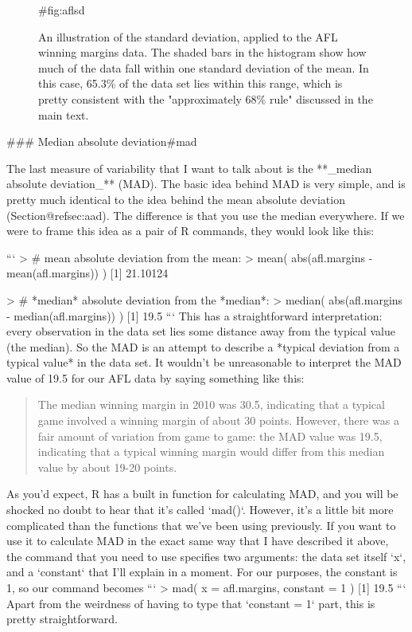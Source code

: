 \begin{figure}[t]
\begin{center}
\caption{An illustration of the standard deviation, applied to the AFL winning margins data. The shaded bars in the histogram show how much of the data fall within one standard deviation of the mean. In this case, 65.3\% of the data set lies within this range, which is pretty consistent with the "approximately 68\% rule" discussed in the main text.}
{#fig:aflsd}
\HR
\end{center}
\end{figure}


### Median absolute deviation{#mad \advanced}

The last measure of variability that I want to talk about is the **_median absolute deviation_** (MAD). The basic idea behind MAD is very simple, and is pretty much identical to the idea behind the mean absolute deviation (Section@refsec:aad). The difference is that you use the median everywhere. If we were to frame this idea as a pair of R commands, they would look like this:

```
> # mean absolute deviation from the mean:
> mean( abs(afl.margins - mean(afl.margins)) )
[1] 21.10124

> # *median* absolute deviation from the *median*:
> median( abs(afl.margins - median(afl.margins)) )
[1] 19.5
```
This has a straightforward interpretation: every observation in the data set lies some distance away from the typical value (the median). So the MAD is an attempt to describe a *typical deviation from a typical value* in the data set. It wouldn't be unreasonable to interpret the MAD value of 19.5 for our AFL data by saying something like this:
\begin{quote}
The median winning margin in 2010 was 30.5, indicating that a typical game involved a winning margin of about 30 points. However, there was a fair amount of variation from game to game: the MAD value was 19.5, indicating that a typical winning margin would differ from this median value by about 19-20 points.
\end{quote}
As you'd expect, R has a built in function for calculating MAD, and you will be shocked no doubt to hear that it's called `mad()`. However, it's a little bit more complicated than the functions that we've been using previously. If you want to use it to calculate MAD in the exact same way that I have described it above, the command that you need to use specifies two arguments: the data set itself `x`, and a `constant` that I'll explain in a moment. For our purposes, the constant is 1, so our command becomes
```
> mad( x = afl.margins, constant = 1 )
[1] 19.5
```
Apart from the weirdness of having to type that `constant = 1` part, this is pretty straightforward.

